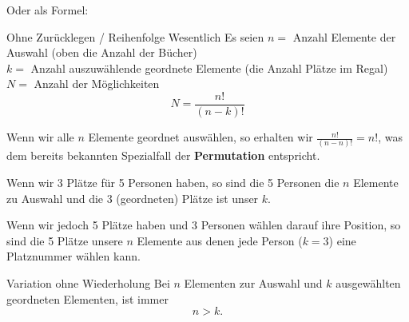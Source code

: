 
Oder als Formel:
\begin{gesetz}{Ohne Zurücklegen / Reihenfolge Wesentlich}{}
Es seien
$n = $ Anzahl Elemente der Auswahl (oben die Anzahl der Bücher)\\
$k = $ Anzahl auszuwählende geordnete Elemente (die Anzahl Plätze im Regal)\\
$N = $ Anzahl der Möglichkeiten\\

$$N =\frac{n!}{(n-k)!}$$
\end{gesetz}
\newpage

\begin{bemerkung}{}{}
Wenn wir alle $n$ Elemente geordnet auswählen, so erhalten wir
$\frac{n!}{(n-n)!} = n!$, was dem bereits bekannten Spezialfall der \textbf{Permutation}
entspricht.
\end{bemerkung}

\begin{bemerkung}{}{}
Wenn wir 3 Plätze für 5 Personen haben, so sind die 5 Personen die $n$
Elemente zu Auswahl und die 3 (geordneten) Plätze ist unser $k$.

Wenn wir jedoch 5 Plätze haben und 3 Personen wählen darauf ihre
Position, so sind die 5 Plätze unsere $n$ Elemente aus denen jede
Person ($k=3$) eine Platznummer wählen kann.
\end{bemerkung}

\newpage

\begin{gesetz}{Variation ohne Wiederholung}{}
Bei $n$ Elementen zur Auswahl und $k$ ausgewählten geordneten
Elementen, ist immer
$$n > k.$$
\end{gesetz}



